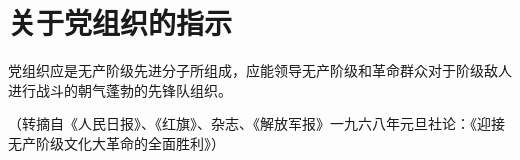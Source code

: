 \section[关于党组织的指示（一九六七年七月）]{关于党组织的指示}


党组织应是无产阶级先进分子所组成，应能领导无产阶级和革命群众对于阶级敌人进行战斗的朝气蓬勃的先锋队组织。

{\raggedleft （转摘自《人民日报》、《红旗》、杂志、《解放军报》一九六八年元旦社论：《迎接无产阶级文化大革命的全面胜利》）\par}



